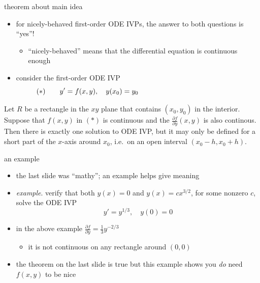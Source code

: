 \documentclass{beamer}
\begin{document}
\begin{frame}{theorem about main idea}

\begin{itemize}
\item for nicely-behaved first-order ODE IVPs, the answer to both questions is ``yes''!
    \begin{itemize}
    \item ``nicely-behaved'' means that the differential equation is continuous enough
    \end{itemize}
\item consider the first-order ODE IVP
    $$(\ast) \qquad y' = f(x,y), \quad y(x_0) = y_0 \hspace{50mm}$$
\end{itemize}

\begin{theorem}[1.2.1]
Let $R$ be a rectangle in the $xy$ plane that contains $(x_0,y_0)$ in the interior.  Suppose that $f(x,y)$ in $(\ast)$ is continuous and the $\frac{\partial f}{\partial y}(x,y)$ is also continous.  Then there is exactly one solution to ODE IVP, but it may only be defined for a short part of the $x$-axis around $x_0$, i.e.~on an open interval $(x_0-h,x_0+h)$.
\end{theorem}
\end{frame}


\begin{frame}{an example}

\begin{itemize}
\item the last slide was ``mathy''; an example helps give meaning
\item \emph{example}.  verify that both $y(x)=0$ and $y(x)=c x^{3/2}$, for some nonzero $c$, solve the ODE IVP
    $$y' = y^{1/3}, \quad y(0)=0$$

\vspace{30mm}
\item in the above example $\frac{\partial f}{\partial y} = \frac{1}{3} y^{-2/3}$
    \begin{itemize}
        \item it is not continuous on any rectangle around $(0,0)$
    \end{itemize}
\item the theorem on the last slide is true but this example shows you \emph{do} need $f(x,y)$ to be nice
\end{itemize}
\end{frame}
\end{document}
